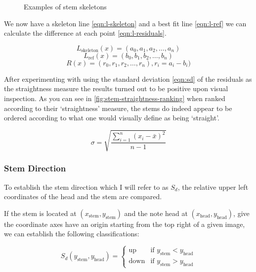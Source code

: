 \begin{figure}[h!]
    \caption{Examples of stem skeletons}
    \label{fig:stem-skeletons}
\end{figure}

We now have a skeleton line \cref{eqn:l-skeleton} and a best fit line \cref{eqn:l-ref} we can calculate the difference at each point \cref{eqn:l-residuals}.

\begin{equation} \label{eqn:l-skeleton}
    L_{\text{skeleton}}(x) = (a_0, a_1, a_2, \ldots, a_n)
\end{equation}
\begin{equation} \label{eqn:l-ref}
    L_{\text{ref}}(x) = (b_0, b_1, b_2, \ldots, b_n)
\end{equation}
\begin{equation} \label{eqn:l-residuals}
    R(x) = (r_0, r_1, r_2, \ldots, r_n), r_i = a_i - b_i)
\end{equation}


After experimenting with using the standard deviation \cref{eqn:sd} of the residuals as the straightness measure the results turned out to be positive upon visual inspection. As you can see in \cref{fig:stem-straightness-ranking} when ranked according to their `straightness' measure, the stems do indeed appear to be ordered according to what one would visually define as being `straight'.

\begin{equation} \label{eqn:sd}
\sigma = \sqrt{\frac{\sum\limits_{i=1}^{n}\left(x_{i} - \bar{x}\right)^{2}}{n-1}}
\end{equation}




\subsubsection{Stem Direction}

To establish the stem direction which I will refer to as $S_d$, the relative upper left coordinates of the head and the stem are compared.

If the stem is located at $(x_{\text{stem}}, y_{\text{stem}})$ and the note head at $(x_{\text{head}}, y_{\text{head}})$, give the coordinate axes have an origin starting from the top right of a given image, we can establish the following classifications:

$$
S_{d} (y_{\text{stem}}, y_{\text{head}}) =
\left\{
	\begin{array}{ll}
		\text{up}   & \mbox{if } y_{\text{stem}} < y_{\text{head}} \\
		\text{down} & \mbox{if } y_{\text{stem}} > y_{\text{head}}
	\end{array}
\right.
$$

